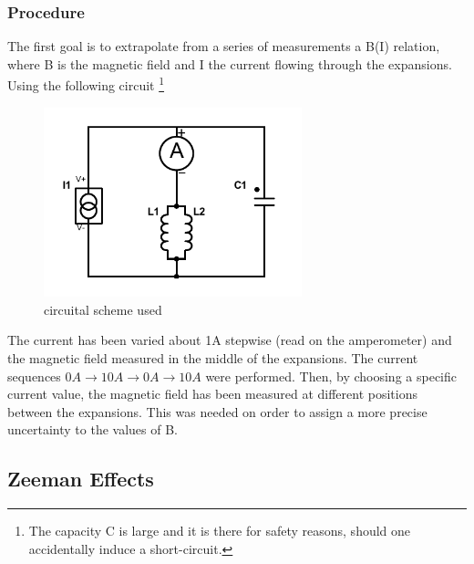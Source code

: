 \documentclass[a4paper,12pt,abstracton]{scrartcl}
\begin{document}
\subsubsection{Procedure}
The first goal is to extrapolate from a series of measurements a B(I) relation, where B is the magnetic field and I the current flowing through the expansions. 
Using the following circuit \footnote{The capacity C is large and it is there for safety reasons, should one accidentally induce a short-circuit.}
\begin{figure}[H]
\begin{center}
\includegraphics[trim=0cm 0cm 0cm 0cm,clip,width=7.5cm,keepaspectratio]{images/circuito.pdf} 
\caption{circuital scheme used}
\end{center} 
\end{figure}
The current has been varied about 1A stepwise (read on the amperometer) and the magnetic field measured in the middle of the expansions. The current sequences $0A \longrightarrow 10A \longrightarrow 0A \longrightarrow 10A$ were performed.
Then, by choosing a specific current value, the magnetic field has been measured at different positions between the expansions. This was needed on order to assign a more precise uncertainty to the values of B.
\subsection{Zeeman Effects}
\end{document}
